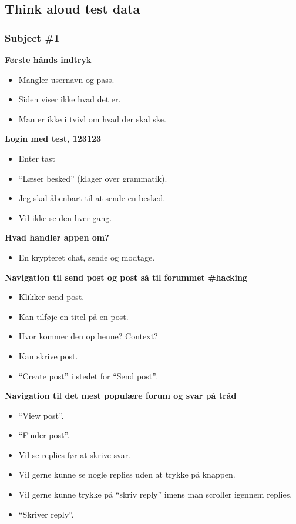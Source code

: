\subsection{Think aloud test data}
\label{appendix:thinkaloud}

\subsubsection{Subject \#1}

\noindent\textbf{Første hånds indtryk}
\begin{itemize}
    \item Mangler usernavn og pass.
    \item Siden viser ikke hvad det er.
    \item Man er ikke i tvivl om hvad der skal ske.
\end{itemize}

\noindent\textbf{Login med test, 123123}
\begin{itemize}
    \item Enter tast
    \item “Læser besked” (klager over grammatik).
    \item Jeg skal åbenbart til at sende en besked.
    \item Vil ikke se den hver gang.
\end{itemize}

\noindent\textbf{Hvad handler appen om?}
\begin{itemize}
    \item En krypteret chat, sende og modtage.
\end{itemize}

\noindent\textbf{Navigation til send post og post så til forummet \#hacking}
\begin{itemize}
    \item Klikker send post.
    \item Kan tilføje en titel på en post.
    \item Hvor kommer den op henne? Context?
    \item Kan skrive post.
    \item “Create post” i stedet for “Send post”.
\end{itemize}

\noindent\textbf{Navigation til det mest populære forum og svar på tråd}
\begin{itemize}
    \item “View post”.
    \item “Finder post”.
    \item Vil se replies før at skrive svar.
    \item Vil gerne kunne se nogle replies uden at trykke på knappen.
    \item Vil gerne kunne trykke på “skriv reply” imens man scroller igennem replies.
    \item “Skriver reply”.
\end{itemize}

